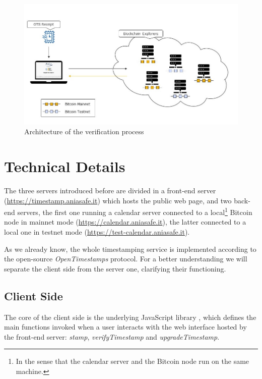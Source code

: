 \bigskip
\begin{figure}[!htb]
    \centering
	\includegraphics[width=1\linewidth]{Images/project-verifying.jpg}
	\caption{Architecture of the verification process}
	\label{fig:ots-project-verifying}
\end{figure}

\bigskip
\section{Technical Details}
The three servers introduced before are divided in a front-end server (\url{https://timestamp.aniasafe.it}) which hosts the public web page, and two back-end servers, the first one running a calendar server connected to a local\footnote{In the sense that the calendar server and the Bitcoin node run on the same machine.} Bitcoin node in mainnet mode (\url{https://calendar.aniasafe.it}), the latter connected to a local one in testnet mode (\url{https://test-calendar.aniasafe.it}).

\bigskip
\noindent
As we already know, the whole timestamping service is implemented according to the open-source \textit{OpenTimestamps} protocol. For a better understanding we will separate the client side from the server one, clarifying their functioning.

\bigskip
\subsection{Client Side}
\label{sec:client-side}
The core of the client side is the underlying JavaScript library \cite{LibraryRepositoryGitHub}, which defines the main functions invoked when a user interacts with the web interface hosted by the front-end server: \textit{stamp}, \textit{verifyTimestamp} and \textit{upgradeTimestamp}.


